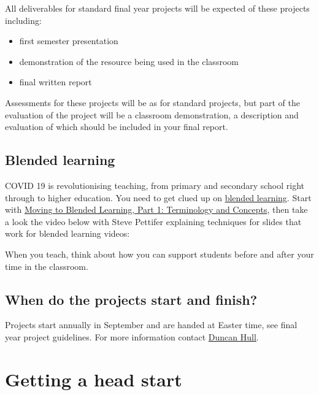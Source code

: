 \documentclass[
  12pt,
]{book}
\providecommand{\tightlist}{%
  \setlength{\itemsep}{0pt}\setlength{\parskip}{0pt}}
\begin{document}
All deliverables for standard final year projects will be expected of these projects including:

\begin{itemize}
\tightlist
\item
  first semester presentation
\item
  demonstration of the resource being used in the classroom
\item
  final written report
\end{itemize}

Assessments for these projects will be as for standard projects, \citep{COMP30030, COMP30040} but part of the evaluation of the project will be a classroom demonstration, a description and evaluation of which should be included in your final report.

\hypertarget{blended}{%
\subsection{Blended learning}\label{blended}}

COVID 19 is revolutionising teaching, from primary and secondary school right through to higher education. You need to get clued up on \href{https://en.wikipedia.org/wiki/Blended_learning}{blended learning}. Start with \href{http://www.elearning.fse.manchester.ac.uk/fseta/moving-to-blended-learning-part-1-terminology-and-concepts/}{Moving to Blended Learning, Part 1: Terminology and Concepts}, then take a look the video below with Steve Pettifer explaining techniques for slides that work for blended learning videos:

When you teach, think about how you can support students before and after your time in the classroom.

\hypertarget{finishing}{%
\subsection{When do the projects start and finish?}\label{finishing}}

Projects start annually in September and are handed at Easter time, see final year project guidelines. For more information contact \protect\hyperlink{Contact}{Duncan Hull}.

\hypertarget{getting-a-head-start}{%
\section{Getting a head start}\label{getting-a-head-start}}
\end{document}
